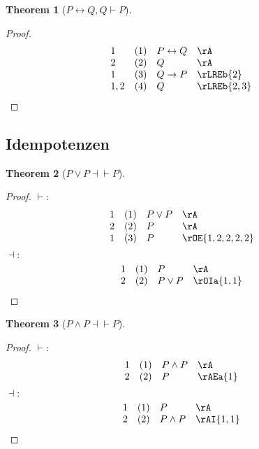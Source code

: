 \documentclass{book}
\theoremstyle{plain}
\newtheorem{theorem}{Theorem}
\theoremstyle{remark}
\theoremstyle{definition}
\begin{document}
\label{PLrQwQImpP}
\begin{theorem}[\( P \leftrightarrow Q, Q \vdash P \)]
\end{theorem}
\begin{proof}
	\[
	\begin{array}{llll}
		1 & (1) & P \leftrightarrow Q & \rA \\
		2 & (2) & Q & \rA \\
		1 & (3) & Q\rightarrow P & \rLREb{2} \\
		1,2 & (4) & Q & \rLREb{2,3} \\
	\end{array}
	\]
\end{proof}

\subsection{Idempotenzen}

\label{POrPEqvP}
\begin{theorem}[\( P \lor P \dashv\vdash P \)]
\end{theorem}
\begin{proof}
	\(\vdash:\)
	\[
	\begin{array}{llll}
		1 & (1) & P \lor P & \rA \\
		2 & (2) & P & \rA \\
		1 & (3) & P & \rOE{1,2,2,2,2} \\
	\end{array}
	\]
	\(\dashv:\)
	\[
	\begin{array}{llll}
		1 & (1) & P & \rA \\
		2 & (2) & P\lor P & \rOIa{1,1} \\
	\end{array}
	\]
\end{proof}

\label{PAndPEqvP}
\begin{theorem}[\( P \land P \dashv\vdash P \)]
\end{theorem}
\begin{proof}
	\(\vdash:\)
	\[
	\begin{array}{llll}
		1 & (1) & P \land P & \rA \\
		2 & (2) & P & \rAEa{1} \\
	\end{array}
	\]
	\(\dashv:\)
	\[
	\begin{array}{llll}
		1 & (1) & P & \rA \\
		2 & (2) & P\land P & \rAI{1,1} \\
	\end{array}
	\]
\end{proof}
\end{document}
